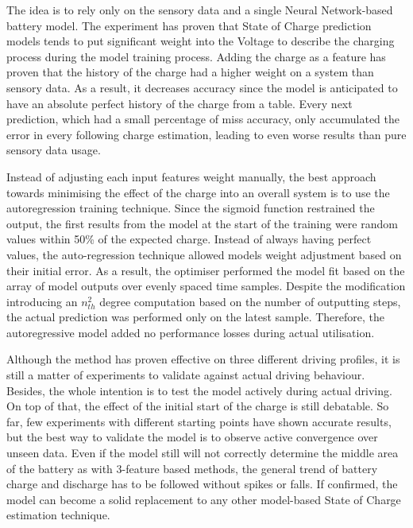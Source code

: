 The idea is to rely only on the sensory data and a single Neural Network-based battery model.
The experiment has proven that State of Charge prediction models tends to put significant weight into the Voltage to describe the charging process during the model training process.
Adding the charge as a feature has proven that the history of the charge had a higher weight on a system than sensory data.
As a result, it decreases accuracy since the model is anticipated to have an absolute perfect history of the charge from a table.
Every next prediction, which had a small percentage of miss accuracy, only accumulated the error in every following charge estimation, leading to even worse results than pure sensory data usage.

%
%
Instead of adjusting each input features weight manually, the best approach towards minimising the effect of the charge into an overall system is to use the autoregression training technique. 
Since the sigmoid function restrained the output, the first results from the model at the start of the training were random values within 50\% of the expected charge.
Instead of always having perfect values, the auto-regression technique allowed models weight adjustment based on their initial error.
As a result, the optimiser performed the model fit based on the array of model outputs over evenly spaced time samples.
Despite the modification introducing an $n_{th}^{2}$ degree computation based on the number of outputting steps, the actual prediction was performed only on the latest sample.
Therefore, the autoregressive model added no performance losses during actual utilisation. 

%
%
Although the method has proven effective on three different driving profiles, it is still a matter of experiments to validate against actual driving behaviour.
Besides, the whole intention is to test the model actively during actual driving.
On top of that, the effect of the initial start of the charge is still debatable.
So far, few experiments with different starting points have shown accurate results, but the best way to validate the model is to observe active convergence over unseen data.
Even if the model still will not correctly determine the middle area of the battery as with 3-feature based methods, the general trend of battery charge and discharge has to be followed without spikes or falls.
If confirmed, the model can become a solid replacement to any other model-based State of Charge estimation technique.
